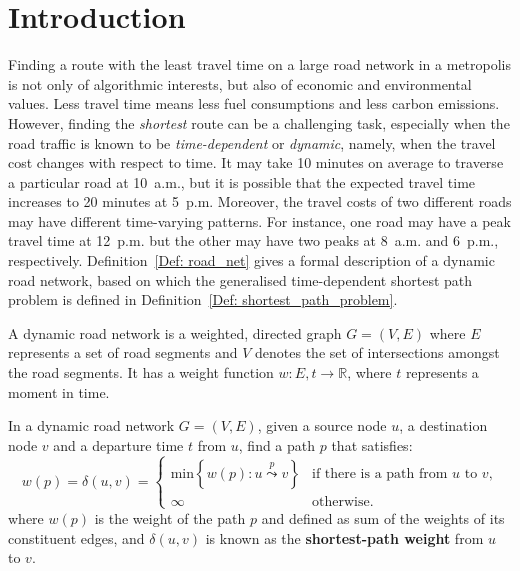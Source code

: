 \chapter{Introduction}

Finding a route with the least travel time on a large road network in a metropolis is not only of algorithmic interests, but also of economic and environmental values. Less travel time means less fuel consumptions and less carbon emissions. However, finding the \emph{shortest} route can be a challenging task, especially when the road traffic is known to be \emph{time-dependent} or \emph{dynamic}, namely, when the travel cost changes with respect to time. It may take 10 minutes on average to traverse a particular road at 10~a.m., but it is possible that the expected travel time increases to 20 minutes at 5~p.m. Moreover, the travel costs of two different roads may have different time-varying patterns. For instance, one road may have a peak travel time at 12~p.m. but the other may have two peaks at 8~a.m. and 6~p.m., respectively. Definition~\ref{Def: road_net} gives a formal description of a dynamic road network, based on which the generalised time-dependent shortest path problem is defined in Definition~\ref{Def: shortest_path_problem}.

\begin{defn}\label{Def: road_net}
A dynamic road network is a weighted, directed graph $G=(V,E)$ where $E$ represents a set of road segments and $V$ denotes the set of intersections amongst the road segments. It has a weight function $w : E,t \rightarrow \mathbb{R}$, where $t$ represents a moment in time. 
\end{defn}

\begin{defn}\label{Def: shortest_path_problem}
In a dynamic road network $G=(V,E)$, given a source node $u$, a destination node $v$ and a departure time $t$ from $u$, find a path $p$ that satisfies:
\begin{equation}
w(p)=\delta(u,v)=
\begin{cases}
\text{min}\left\{w(p): u\overset{p}{\leadsto}v \right\} &\text{if there is a path from $u$ to $v$,}\\
\infty &\text{otherwise.}
\end{cases}
\end{equation}
where $w(p)$ is the weight of the path $p$ and defined as sum of the weights of its constituent edges, and $\delta(u,v)$ is known as the \textbf{shortest-path weight} from $u$ to $v$.
\end{defn}

